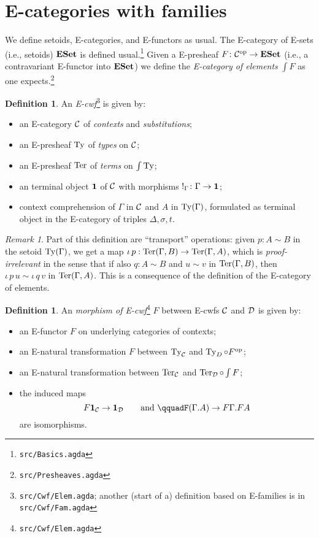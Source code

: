 \documentclass{amsart}
\theoremstyle{plain}
\theoremstyle{definition}
\newtheorem{definition}[theorem]{Definition}
\theoremstyle{remark}
\newtheorem{remark}[theorem]{Remark}
\begin{document}
\section{E-categories with families}
\label{sec:e-cwfs}

We define setoids, E-categories, and E-functors as usual.  The
E-category of E-sets (i.e., setoids) $\mathbf{ESet}$ is defined
usual.\footnote{\texttt{src/Basics.agda}} Given a E-presheaf $F \colon
\mathcal{C}^{\mathrm{op}} \to \mathbf{ESet}$ (i.e., a contravariant E-functor into $\mathbf{ESet}$) we
define the \emph{E-category of elements} $\int F$ as one
expects.\footnote{\texttt{src/Presheaves.agda}}

\begin{definition}
  An \emph{E-cwf}\footnote{\texttt{src/Cwf/Elem.agda}; another (start
    of a) definition based on E-families is in
    \texttt{src/Cwf/Fam.agda}} is given by:
  \begin{itemize}
  \item an E-category $\mathcal{C}$ of \emph{contexts} and
    \emph{substitutions};
  \item an E-presheaf $\operatorname{Ty}$ of \emph{types} on $\mathcal{C}$;
  \item an E-presheaf $\operatorname{Ter}$ of \emph{terms} on $\int \operatorname{Ty}$;
  \item an terminal object $\mathbf{1}$ of $\mathcal{C}$ with morphisms
    $\mathbf{!}_\Gamma \colon \Gamma \to \mathbf{1}$;
  \item context comprehension of $\Gamma$ in $\mathcal{C}$ and $A$ in $\operatorname{Ty}
    (\Gamma)$, formulated as terminal object in the E-category of
    triples $\Delta,\sigma, t$.
  \end{itemize}
\end{definition}

\begin{remark}
  Part of this definition are ``transport'' operations: given $p : A
  \sim B$ in the setoid $\operatorname{Ty}(\Gamma)$, we get a map $\iota\,p : \operatorname{Ter}
  (\Gamma, B) \to \operatorname{Ter}(\Gamma,A)$, which is \emph{proof-irrelevant} in
  the sense that if also $q : A \sim B$ and $u \sim v$ in $\operatorname{Ter}
  (\Gamma,B)$, then $\iota\,p\,u \sim \iota\,q\,v$ in $\operatorname{Ter}
  (\Gamma,A)$.  This is a consequence of the definition of the
  E-category of elements.
\end{remark}

\begin{definition}
  An \emph{morphism of E-cwf}\footnote{\texttt{src/Cwf/Elem.agda}} $F$
  between E-cwfs $\mathcal{C}$ and $\mathcal{D}$ is given by:
  \begin{itemize}
  \item an E-functor $F$ on underlying categories of contexts;
  \item an E-natural transformation $F$ between $\operatorname{Ty}_{\mathcal{C}}$ and $\operatorname{Ty}_D
    \circ F^{\mathrm{op}}$;
  \item an E-natural transformation between $\operatorname{Ter}_{\mathcal{C}}$ and $\operatorname{Ter}_{\mathcal{D}}
    \circ \int F$;
  \item the induced maps
    \[
      F \emptyctx_\C \to \emptyctx_\D%
      \qquad \text{and } \qquad%
      F (\Gamma. A) \to F \Gamma. F A
    \]
    are isomorphisms.
  \end{itemize}
\end{definition}
\end{document}
